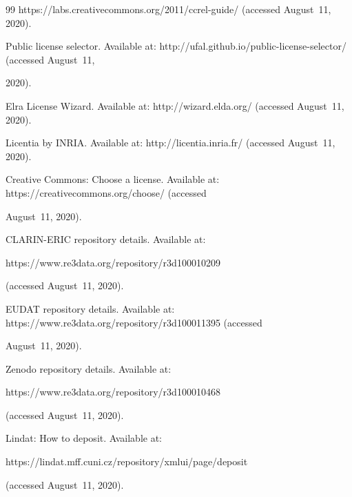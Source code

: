 {{\begin{thebibliography}{99}
{https://\linebreak labs.creativecommons.org/2011/ccrel-guide/} (accessed August~11, 2020).


Public license selector. Available at: {\sf http://ufal.github.io/public-license-selector/} (accessed August~11, 

2020).


Elra License Wizard. Available at: {\sf http://wizard.elda.org/} (accessed August~11, 2020).


Licentia by INRIA. Available at: {\sf http://licentia.inria.fr/} (accessed August~11, 2020).


Creative Commons: Choose a license. Available at: {\sf https://creativecommons.org/\linebreak choose/} (accessed 

August~11, 2020).


CLARIN-ERIC repository details. Available at: {\sf  

https://www.re3data.org/\linebreak repository/r3d100010209} (accessed August~11, 2020).




EUDAT repository details. Available at: {\sf https://www.re3data.org/repository/\linebreak r3d100011395} (accessed 

August~11, 2020).




Zenodo repository details. Available at: {\sf 

https://www.re3data.org/repository/\linebreak r3d100010468} (accessed August~11, 2020).


Lindat: How to deposit. Available at: {\sf

https://lindat.mff.cuni.cz/repository/xmlui/\linebreak page/deposit} (accessed August~11, 2020).





\end{thebibliography}}}
